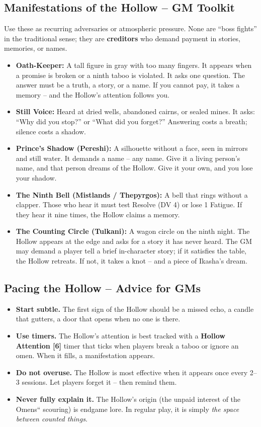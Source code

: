 \documentclass[11pt,letterpaper,twoside]{book}
\begin{document}
\subsection*{Manifestations of the Hollow -- GM Toolkit}

Use these as recurring adversaries or atmospheric pressure. None are ``boss fights'' in the traditional sense; they are \textbf{creditors} who demand payment in stories, memories, or names.

\begin{itemize}
  \item \textbf{Oath-Keeper:} A tall figure in gray with too many fingers. It appears when a promise is broken or a ninth taboo is violated. It asks one question. The answer must be a truth, a story, or a name. If you cannot pay, it takes a memory -- and the Hollow's attention follows you.
  \item \textbf{Still Voice:} Heard at dried wells, abandoned cairns, or sealed mines. It asks: ``Why did you stop?'' or ``What did you forget?'' Answering costs a breath; silence costs a shadow.
  \item \textbf{Prince's Shadow (Pereshi):} A silhouette without a face, seen in mirrors and still water. It demands a name -- any name. Give it a living person's name, and that person dreams of the Hollow. Give it your own, and you lose your shadow.
  \item \textbf{The Ninth Bell (Mistlands / Thepyrgos):} A bell that rings without a clapper. Those who hear it must test Resolve (DV 4) or lose 1 Fatigue. If they hear it nine times, the Hollow claims a memory.
  \item \textbf{The Counting Circle (Tulkani):} A wagon circle on the ninth night. The Hollow appears at the edge and asks for a story it has never heard. The GM may demand a player tell a brief in-character story; if it satisfies the table, the Hollow retreats. If not, it takes a knot -- and a piece of Ikasha's dream.
\end{itemize}

\subsection*{Pacing the Hollow -- Advice for GMs}

\begin{itemize}
  \item \textbf{Start subtle.} The first sign of the Hollow should be a missed echo, a candle that gutters, a door that opens when no one is there.
  \item \textbf{Use timers.} The Hollow's attention is best tracked with a \textbf{Hollow Attention [6]} timer that ticks when players break a taboo or ignore an omen. When it fills, a manifestation appears.
  \item \textbf{Do not overuse.} The Hollow is most effective when it appears once every 2--3 sessions. Let players forget it -- then remind them.
  \item \textbf{Never fully explain it.} The Hollow's origin (the unpaid interest of the Omens`` scouring) is endgame lore. In regular play, it is simply \textit{the space between counted things}.
\end{itemize}
\end{document}
